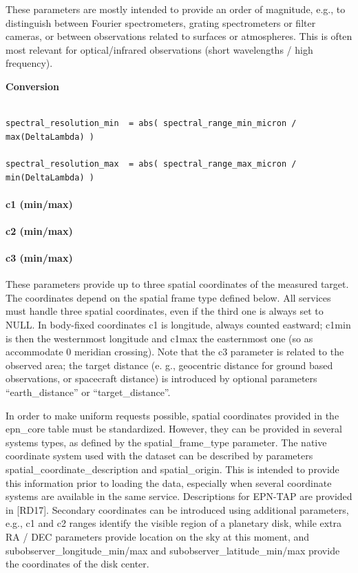 \documentclass[11pt,a4paper]{ivoa}
\begin{document}
These parameters are mostly intended to provide an order of magnitude, e.g., to distinguish between Fourier spectrometers, grating spectrometers or filter cameras, or between observations related to surfaces or atmospheres. This is often most relevant for optical/infrared observations (short wavelengths / high frequency).

\textbf{Conversion}

\begin{verbatim}

spectral_resolution_min  = abs( spectral_range_min_micron / max(DeltaLambda) )

spectral_resolution_max  = abs( spectral_range_max_micron / min(DeltaLambda) )

\end{verbatim}

\paragraph{c1 (min/max)}

\paragraph{c2 (min/max)}

\paragraph{c3 (min/max)}

These parameters provide up to three spatial coordinates of the measured target. The coordinates depend on the spatial frame type defined below. All services must handle three spatial coordinates, even if the third one is always set to NULL. In body-fixed coordinates c1 is longitude, always counted eastward; c1min is then the westernmost longitude and c1max the easternmost one (so as accommodate 0 meridian crossing). Note that the c3 parameter is related to the observed area; the target distance (e. g., geocentric distance for ground based observations, or spacecraft distance) is introduced by optional parameters  ``earth\_distance'' or ``target\_distance''.

In order to make uniform requests possible, spatial coordinates provided in the epn\_core table must be standardized. However, they can be provided in several systems types, as defined by the spatial\_frame\_type parameter.  The native coordinate system used with the dataset can be described by parameters spatial\_coordinate\_description and spatial\_origin. This is intended to provide this information prior to loading the data, especially when several coordinate systems are available in the same service. Descriptions for EPN-TAP are provided in [RD17]. Secondary coordinates can be introduced using additional parameters, e.g., c1 and c2 ranges identify the visible region of a planetary disk, while extra RA / DEC parameters provide location on the sky at this moment, and subobserver\_longitude\_min/max and subobserver\_latitude\_min/max provide the coordinates of the disk center.
\end{document}
